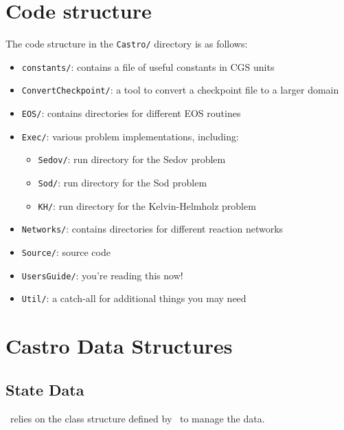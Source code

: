 \section{Code structure}

The code structure in the {\tt Castro/} directory is as follows:
\begin{itemize}
\item {\tt constants/}: contains a file of useful constants in CGS units

\item {\tt ConvertCheckpoint/}: a tool to convert a checkpoint file to
  a larger domain

\item {\tt EOS/}: contains directories for different EOS routines

\item {\tt Exec/}: various problem implementations, including:
  \begin{itemize}
  \item {\tt Sedov/}: run directory for the Sedov problem
  \item {\tt Sod/}: run directory for the Sod problem
  \item {\tt KH/}: run directory for the Kelvin-Helmholz problem
  \end{itemize}

\item {\tt Networks/}: contains directories for different reaction networks

\item {\tt Source/}: source code

\item {\tt UsersGuide/}: you're reading this now!

\item {\tt Util/}: a catch-all for additional things you may need 
\end{itemize}

\section{Castro Data Structures}

\subsection{State Data}

\castro\ relies on the class structure defined by \boxlib\ to manage the
data.

